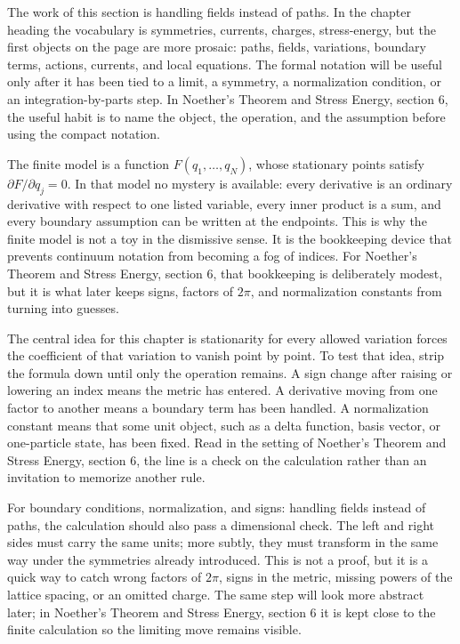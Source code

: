 The work of this section is handling fields instead of paths.  In the chapter heading the vocabulary is symmetries, currents, charges, stress-energy, but the first objects on the page are more prosaic: paths, fields, variations, boundary terms, actions, currents, and local equations.  The formal notation will be useful only after it has been tied to a limit, a symmetry, a normalization condition, or an integration-by-parts step.  In Noether's Theorem and Stress Energy, section 6, the useful habit is to name the object, the operation, and the assumption before using the compact notation.

The finite model is a function \(F(q_1,\ldots,q_N)\), whose stationary points satisfy \( \partial F/\partial q_j=0 \).  In that model no mystery is available: every derivative is an ordinary derivative with respect to one listed variable, every inner product is a sum, and every boundary assumption can be written at the endpoints.  This is why the finite model is not a toy in the dismissive sense.  It is the bookkeeping device that prevents continuum notation from becoming a fog of indices.  For Noether's Theorem and Stress Energy, section 6, that bookkeeping is deliberately modest, but it is what later keeps signs, factors of \(2\pi\), and normalization constants from turning into guesses.

The central idea for this chapter is stationarity for every allowed variation forces the coefficient of that variation to vanish point by point.  To test that idea, strip the formula down until only the operation remains.  A sign change after raising or lowering an index means the metric has entered.  A derivative moving from one factor to another means a boundary term has been handled.  A normalization constant means that some unit object, such as a delta function, basis vector, or one-particle state, has been fixed.  Read in the setting of Noether's Theorem and Stress Energy, section 6, the line is a check on the calculation rather than an invitation to memorize another rule.

For boundary conditions, normalization, and signs: handling fields instead of paths, the calculation should also pass a dimensional check.  The left and right sides must carry the same units; more subtly, they must transform in the same way under the symmetries already introduced.  This is not a proof, but it is a quick way to catch wrong factors of \(2\pi\), signs in the metric, missing powers of the lattice spacing, or an omitted charge.  The same step will look more abstract later; in Noether's Theorem and Stress Energy, section 6 it is kept close to the finite calculation so the limiting move remains visible.

